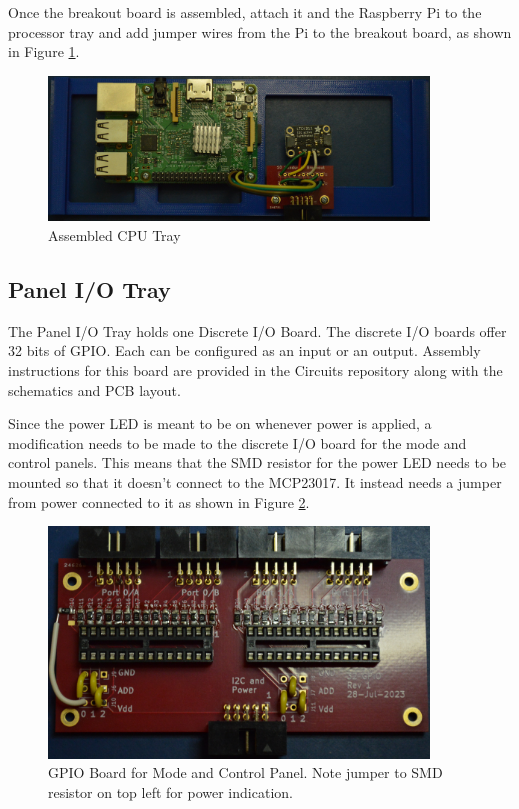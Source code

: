 \documentclass[10pt, openany]{book}
\begin{document}
Once the breakout board is assembled, attach it and the Raspberry Pi to the processor tray and add jumper wires from the Pi to the breakout board, as shown in Figure \ref{fig:CPUTray}.

\begin{figure}[ht!]
  \centering
  \includegraphics[width=0.9\textwidth]{../Pict/CPU-Board.jpg}
  \caption{Assembled CPU Tray}
  \label{fig:CPUTray}
\end{figure}

\clearpage
\subsection{Panel I/O Tray}
The Panel I/O Tray holds one Discrete I/O Board.  The discrete I/O boards offer 32 bits of GPIO.  Each can be configured as an input or an output.  Assembly instructions for this board are provided in the Circuits repository along with the schematics and PCB layout.

Since the power LED is meant to be on whenever power is applied, a modification needs to be made to the discrete I/O board for the mode and control panels.  This means that the SMD resistor for the power LED needs to be mounted so that it doesn't connect to the MCP23017.  It instead needs a jumper from power connected to it as shown in Figure \ref{fig:GPIOCtrl}.

\begin{figure}[ht!]
  \centering
  \includegraphics[width=0.9\textwidth]{../Pict/GPIO-Control.jpg}
  \caption{GPIO Board for Mode and Control Panel.  Note jumper to SMD resistor on top left for power indication.}
  \label{fig:GPIOCtrl}
\end{figure}
\end{document}
